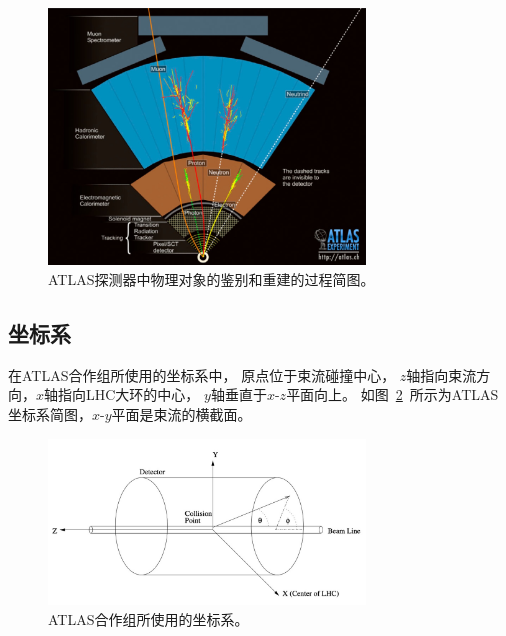 \begin{figure}
  \begin{center}
    \includegraphics[width=0.75\textwidth]{figuresEXP/ATLAS2.jpg}
  \end{center}
  \caption{
  ATLAS探测器中物理对象的鉴别和重建的过程简图。
  }
    \label{fig:ATLAS2}
\end{figure}

\subsection{坐标系}
\label{sec:ATLASCS}

在ATLAS合作组所使用的坐标系中，
原点位于束流碰撞中心，
$z$轴指向束流方向，$x$轴指向LHC大环的中心，
$y$轴垂直于$x$-$z$平面向上。
如图~\ref{fig:ATLAS3}~所示为ATLAS坐标系简图，$x$-$y$平面是束流的横截面。

\begin{figure}
  \begin{center}
    \includegraphics[width=0.75\textwidth]{figuresEXP/ATLAS3.jpg}
  \end{center}
  \caption{
ATLAS合作组所使用的坐标系。
  }
    \label{fig:ATLAS3}
\end{figure}

